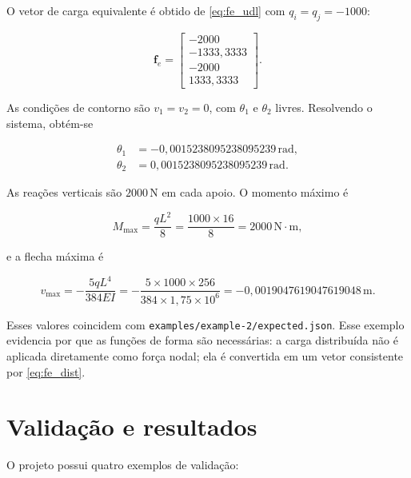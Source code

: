 \documentclass[12pt,a4paper]{article}
\newcommand{\unit}[1]{\,\mathrm{#1}}
\begin{document}
O vetor de carga equivalente é obtido de \eqref{eq:fe_udl} com \(q_i=q_j=-1000\):

\begin{equation}
  \mathbf{f}_e =
  \begin{bmatrix}
    -2000\\
    -1333{,}3333\\
    -2000\\
    1333{,}3333
  \end{bmatrix}.
  \label{eq:ex2_fe}
\end{equation}

As condições de contorno são \(v_1=v_2=0\), com \(\theta_1\) e \(\theta_2\) livres. Resolvendo o sistema, obtém-se

\begin{align}
  \theta_1 &= -0{,}0015238095238095239\unit{rad}, \label{eq:ex2_theta1}\\
  \theta_2 &= 0{,}0015238095238095239\unit{rad}. \label{eq:ex2_theta2}
\end{align}

As reações verticais são \(2000\unit{N}\) em cada apoio. O momento máximo é

\begin{equation}
  M_{\max} = \frac{qL^2}{8}
  = \frac{1000\times16}{8}
  = 2000\unit{N\cdot m},
  \label{eq:ex2_Mmax}
\end{equation}

e a flecha máxima é

\begin{equation}
  v_{\max} = -\frac{5qL^4}{384EI}
  = -\frac{5\times1000\times256}{384\times1{,}75\times10^6}
  = -0{,}0019047619047619048\unit{m}.
  \label{eq:ex2_vmax}
\end{equation}

Esses valores coincidem com \texttt{examples/example-2/expected.json}. Esse exemplo evidencia por que as funções de forma são necessárias: a carga distribuída não é aplicada diretamente como força nodal; ela é convertida em um vetor consistente por \eqref{eq:fe_dist}.

\section{Validação e resultados}
\label{sec:validacao}

O projeto possui quatro exemplos de validação:
\end{document}
